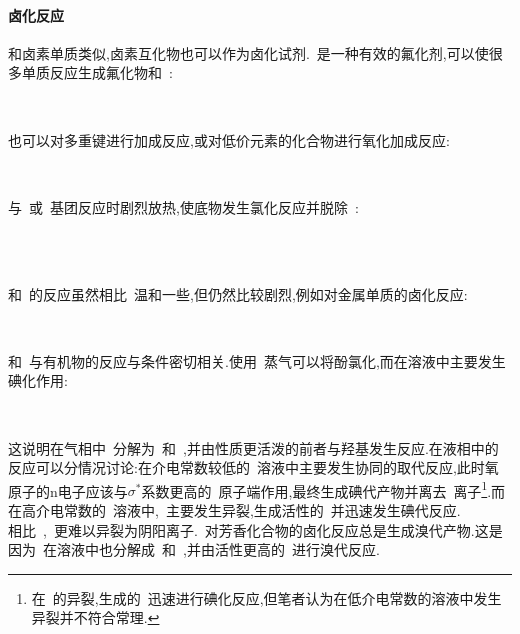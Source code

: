 \documentclass{ctexbook}
\begin{document}
\paragraph{卤化反应}
和卤素单质类似,卤素互化物也可以作为卤化试剂.~是一种有效的氟化剂,可以使很多单质反应生成氟化物和~:
\begin{tightcenter}
    \\
\end{tightcenter}
也可以对多重键进行加成反应,或对低价元素的化合物进行氧化加成反应:
\begin{tightcenter}
    \\
\end{tightcenter}
与~或~基团反应时剧烈放热,使底物发生氯化反应并脱除~:
\begin{tightcenter}
    \\
    \\
\end{tightcenter}
\indent {}和~的反应虽然相比~温和一些,但仍然比较剧烈,例如对金属单质的卤化反应:
\begin{tightcenter}
    \\
\end{tightcenter}
和~与有机物的反应与条件密切相关.使用~蒸气可以将酚氯化,而在溶液中主要发生碘化作用:
\begin{tightcenter}
    \\
\end{tightcenter}
这说明在气相中~分解为~和~,并由性质更活泼的前者与羟基发生反应.在液相中的反应可以分情况讨论:在介电常数较低的~溶液中主要发生协同的取代反应,此时氧原子的n电子应该与$\sigma^\ast$系数更高的~原子端作用,最终生成碘代产物并离去~离子\footnote{在~的异裂,生成的~迅速进行碘化反应,但笔者认为在低介电常数的溶液中发生异裂并不符合常理.}.而在高介电常数的~溶液中,~主要发生异裂,生成活性的~并迅速发生碘代反应.\\
\indent 相比~,~更难以异裂为阴阳离子.~对芳香化合物的卤化反应总是生成溴代产物.这是因为~在溶液中也分解成~和~,并由活性更高的~进行溴代反应.
\end{document}
